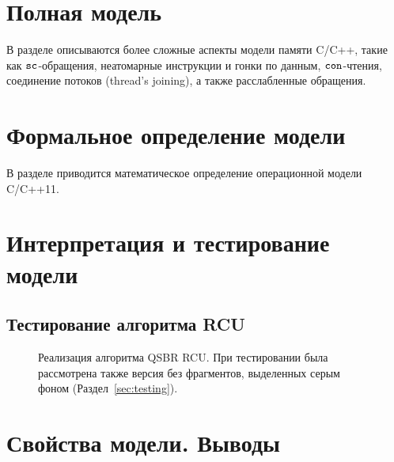 \section{Полная модель}
В разделе описываются более сложные аспекты модели памяти C/C++, такие как
${\mathtt{sc}}$-обращения, неатомарные инструкции и гонки по данным,
${\mathtt{con}}$-чтения, соединение потоков (thread's joining),
а также расслабленные обращения.

\section{Формальное определение модели}
В разделе приводится математическое определение операционной модели C/C++11.

\section{Интерпретация и тестирование модели}

\subsection{Тестирование алгоритма RCU}



\begin{figure*}[t]

\caption[Реализация алгоритма QSBR RCU]
{Реализация алгоритма QSBR RCU.
 При тестировании была рассмотрена также версия без фрагментов, выделенных серым фоном
 (Раздел~\ref{sec:testing}).}
\label{fig:rcuProg}
\end{figure*}

\section{Свойства модели. Выводы}
